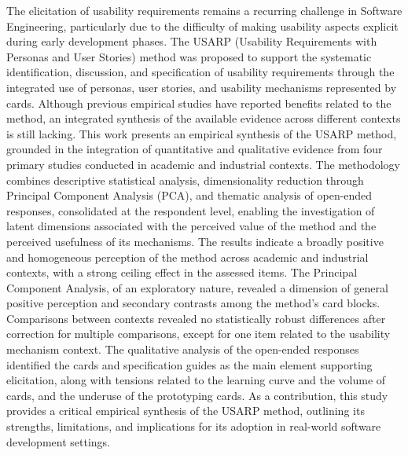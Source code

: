 The elicitation of usability requirements remains a recurring challenge in Software Engineering,
particularly due to the difficulty of making usability aspects explicit during early development
phases. The USARP (Usability Requirements with Personas and User Stories) method was
proposed to support the systematic identification, discussion, and specification of usability
requirements through the integrated use of personas, user stories, and usability mechanisms
represented by cards. Although previous empirical studies have reported benefits related to the
method, an integrated synthesis of the available evidence across different contexts is still lacking.
This work presents an empirical synthesis of the USARP method, grounded in the integration of
quantitative and qualitative evidence from four primary studies conducted in academic and
industrial contexts. The methodology combines descriptive statistical analysis, dimensionality
reduction through Principal Component Analysis (PCA), and thematic analysis of open-ended
responses, consolidated at the respondent level, enabling the investigation of latent dimensions
associated with the perceived value of the method and the perceived usefulness of its mechanisms.
The results indicate a broadly positive and homogeneous perception of the method across academic
and industrial contexts, with a strong ceiling effect in the assessed items. The Principal Component
Analysis, of an exploratory nature, revealed a dimension of general positive perception and
secondary contrasts among the method's card blocks. Comparisons between contexts revealed no
statistically robust differences after correction for multiple comparisons, except for one item related
to the usability mechanism context. The qualitative analysis of the open-ended responses identified
the cards and specification guides as the main element supporting elicitation, along with tensions
related to the learning curve and the volume of cards, and the underuse of the prototyping cards. As
a contribution, this study provides a critical empirical synthesis of the USARP method, outlining its
strengths, limitations, and implications for its adoption in real-world software development settings.

